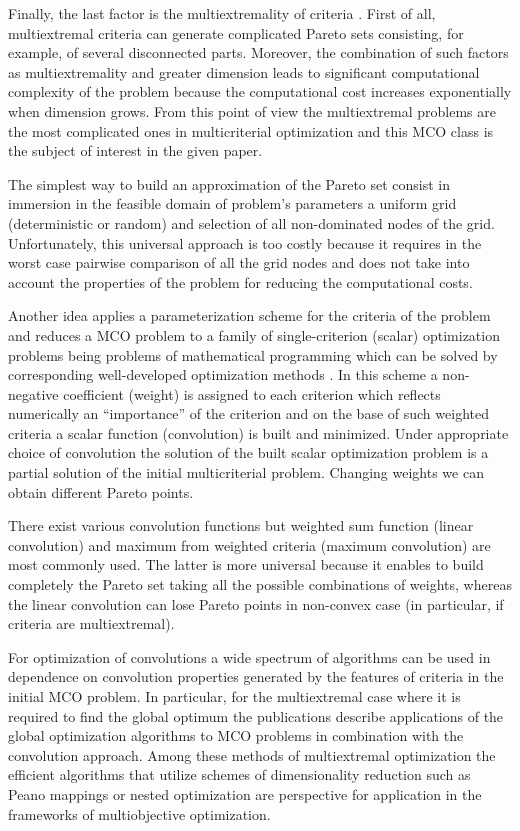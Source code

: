 \documentclass[]{interact}
\theoremstyle{plain}%
\theoremstyle{definition}
\theoremstyle{remark}
\begin{document}
Finally, the last factor is the multiextremality of criteria \cite{Pardalos2017}. First of all, multiextremal criteria can generate complicated Pareto sets consisting, for example, of several disconnected parts. Moreover, the combination of such factors as multiextremality and greater dimension leads to significant computational complexity of the problem because the computational cost increases exponentially when dimension grows. From this point of view the multiextremal problems are the most complicated ones in multicriterial optimization and this MCO class is the subject of interest in the given paper. 

The simplest way to build an approximation of the Pareto set consist in immersion in the feasible domain of problem's parameters a uniform grid (deterministic or random) and selection of all non-dominated nodes of the grid. Unfortunately, this universal approach is too costly because it requires in the worst case pairwise comparison of all the grid nodes and does not take into account the properties of the problem for reducing the computational costs.

Another idea applies a parameterization scheme for the criteria of the problem and reduces a MCO problem to a family of single-criterion (scalar) optimization problems being problems of mathematical programming which can be solved by corresponding well-developed optimization methods \cite{Collette2004,Ehrgott2005}. In this scheme a non-negative coefficient (weight) is assigned to each criterion which reflects numerically an ``importance'' of the criterion and on the base of such weighted criteria a scalar function (convolution) is built and minimized. Under appropriate choice of convolution the solution of the built scalar optimization problem is a partial solution of the initial multicriterial problem. Changing weights we can obtain different Pareto points. 

There exist various convolution functions but weighted sum function (linear convolution) and maximum from weighted criteria (maximum convolution) are most commonly used. The latter is more universal because it enables to build completely the Pareto set taking all the possible combinations of weights, whereas the linear convolution can lose Pareto points in non-convex case (in particular, if criteria are multiextremal).

For optimization of convolutions a wide spectrum of algorithms can be used in dependence on convolution properties generated by the features of criteria in the initial MCO problem. In particular, for the multiextremal case where it is required to find the global optimum the publications \cite{Evtushenko2014,Zilinskas2015,GERGEL2017_1,Gergel2019_2,Barkalov2021} describe applications of the global optimization algorithms to MCO problems in combination with the convolution approach. Among these methods of multiextremal optimization the efficient algorithms that utilize  schemes of dimensionality reduction such as Peano mappings \cite{Strongin2000,Sergeyev2013} or nested optimization \cite{Strongin2000,Grishagin2018} are perspective for application in the  frameworks of multiobjective optimization.
\end{document}
